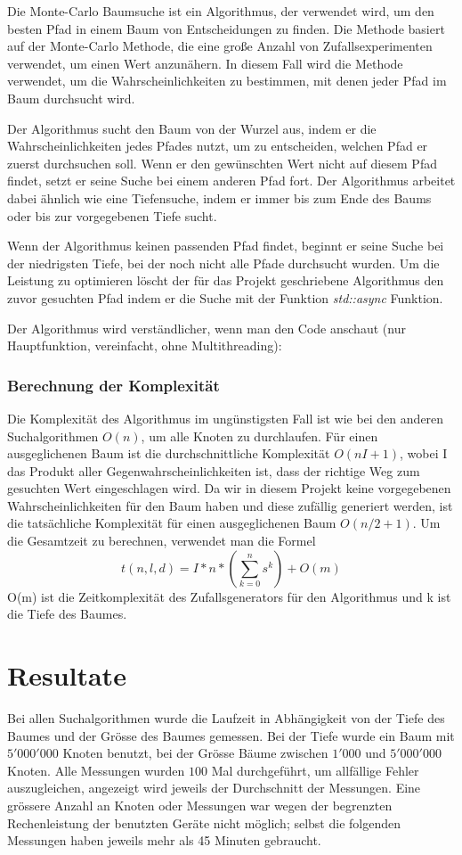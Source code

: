 \documentclass[a4paper,11pt]{article}
\begin{document}
Die Monte-Carlo Baumsuche ist ein Algorithmus, der verwendet wird, um den besten Pfad in einem Baum von Entscheidungen zu finden. Die Methode basiert auf der Monte-Carlo Methode, die eine große Anzahl von Zufallsexperimenten verwendet, um einen Wert anzunähern. In diesem Fall wird die Methode verwendet, um die Wahrscheinlichkeiten zu bestimmen, mit denen jeder Pfad im Baum durchsucht wird.

Der Algorithmus sucht den Baum von der Wurzel aus, indem er die Wahrscheinlichkeiten jedes Pfades nutzt, um zu entscheiden, welchen Pfad er zuerst durchsuchen soll. Wenn er den gewünschten Wert nicht auf diesem Pfad findet, setzt er seine Suche bei einem anderen Pfad fort. Der Algorithmus arbeitet dabei ähnlich wie eine Tiefensuche, indem er immer bis zum Ende des Baums oder bis zur vorgegebenen Tiefe sucht.

Wenn der Algorithmus keinen passenden Pfad findet, beginnt er seine Suche bei der niedrigsten Tiefe, bei der noch nicht alle Pfade durchsucht wurden. Um die Leistung zu optimieren löscht der für das Projekt geschriebene Algorithmus den zuvor gesuchten Pfad indem er die Suche mit der Funktion \emph{std::async} Funktion.

Der Algorithmus wird verständlicher, wenn man den Code anschaut (nur Hauptfunktion, vereinfacht, ohne Multithreading): 



\subsubsection{Berechnung der Komplexität}

Die Komplexität des Algorithmus im ungünstigsten Fall ist wie bei den anderen Suchalgorithmen $O(n)$, um alle Knoten zu durchlaufen. Für einen ausgeglichenen Baum ist die durchschnittliche Komplexität $O(nI+1)$, wobei I das Produkt aller Gegenwahrscheinlichkeiten ist, dass der richtige Weg zum gesuchten Wert eingeschlagen wird. Da wir in diesem Projekt keine vorgegebenen Wahrscheinlichkeiten für den Baum haben und diese zufällig generiert werden, ist die tatsächliche Komplexität für einen ausgeglichenen Baum $O(n/2+1)$. 
Um die Gesamtzeit zu berechnen, verwendet man die Formel $$ t(n,l,d) = I*n*(\sum_{k=0}^{n} s^k) + O(m)$$ O(m) ist die Zeitkomplexität des Zufallsgenerators für den Algorithmus und k ist die Tiefe des Baumes.

\section{Resultate}
Bei allen Suchalgorithmen wurde die Laufzeit in Abhängigkeit von der Tiefe des Baumes und der Grösse des Baumes gemessen. Bei der Tiefe wurde ein Baum mit $5'000'000$ Knoten benutzt, bei der Grösse Bäume zwischen $1'000$ und $5'000'000$ Knoten. Alle Messungen wurden $100$ Mal durchgeführt, um allfällige Fehler auszugleichen, angezeigt wird jeweils der Durchschnitt der Messungen. Eine grössere Anzahl an Knoten oder Messungen war wegen der begrenzten Rechenleistung der benutzten Geräte nicht möglich; selbst die folgenden Messungen haben jeweils mehr als 45 Minuten gebraucht.
\end{document}
